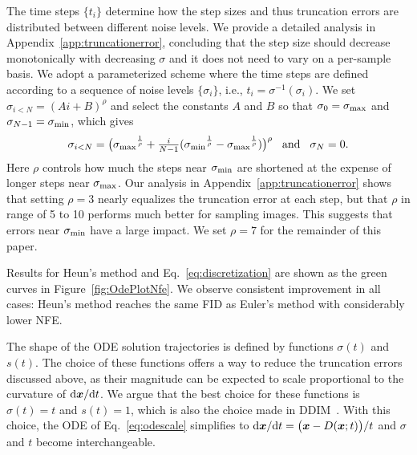 \documentclass{article}
\newif\ifemail
\begin{document}
\algHeun

The time steps $\{t_i\}$ determine how the step sizes and thus truncation errors are distributed between different noise levels.
We provide a detailed analysis in Appendix~{\ref{app:truncationerror}}, concluding that the step size should decrease monotonically with decreasing $\sigma$ and it does not need to vary on a per-sample basis.
We adopt a parameterized scheme where the time steps are defined according to a sequence of noise levels $\{\sigma_i\}$, i.e., $t_i=\sigma^{-1}(\sigma_i)$.
We set $\sigma_{i<N} = (Ai + B)^\rho$ and select the constants $A$ and $B$ so that $\sigma_0 = \smax$ and $\sigma_{N-1} = \smin$, which gives
\begin{equation}
\label{eq:discretization}
\sigma_{i<N} = \big( {\smax}^\frac{1}{\rho} + {\textstyle\frac{i}{N-1}} ( {\smin}^\frac{1}{\rho} - {\smax}^\frac{1}{\rho} ) \big)^\rho \hspace*{3mm}\text{and}\hspace*{3mm}\sigma_N = 0 \text{.}
\end{equation}
Here $\rho$ controls how much the steps near $\smin$ are shortened at the expense of longer steps near $\smax$.
Our analysis in Appendix~{\ref{app:truncationerror}} shows that setting $\rho=3$ nearly equalizes the truncation error at each step,
  but that $\rho$ in range of 5 to 10 performs much better for sampling images.
This suggests that errors near $\smin$ have a large impact.
We set $\rho=7$ for the remainder of this paper.

Results for Heun's method and Eq.~\ref{eq:discretization} are shown as the green curves in Figure~\ref{fig:OdePlotNfe}. %
We observe consistent improvement in all cases: Heun's method reaches the same FID as Euler's method with considerably lower NFE.

\ifemail
  \figTrajectories
\fi

The shape of the ODE solution trajectories is defined by functions $\sigma(t)$ and $s(t)$.
The choice of these functions offers a way to reduce the truncation errors discussed above, as their magnitude can be expected to scale proportional to the curvature of $\mathrm{d}\boldsymbol{x} / \mathrm{d}t$.
We argue that the best choice for these functions is $\sigma(t)=t$ and $s(t)=1$, which is also the choice made in DDIM~\cite{Song2020ddim}.
With this choice, the ODE of Eq.~\ref{eq:odescale} simplifies to $\mathrm{d}\boldsymbol{x} / \mathrm{d}t = \big( \boldsymbol{x} - D(\boldsymbol{x}; t) \big) / t$
{and $\sigma$ and $t$ become interchangeable}.
\end{document}

